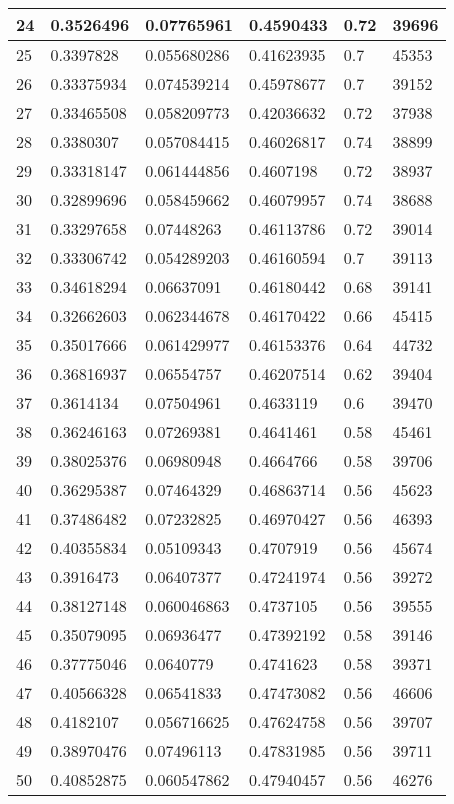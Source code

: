 \begin{longtable}{|l|l|l|l|l|l|}
24 & 0.3526496 & 0.07765961 & 0.4590433 & 0.72 & 39696 \\ \hline 
25 & 0.3397828 & 0.055680286 & 0.41623935 & 0.7 & 45353 \\ \hline 
26 & 0.33375934 & 0.074539214 & 0.45978677 & 0.7 & 39152 \\ \hline 
27 & 0.33465508 & 0.058209773 & 0.42036632 & 0.72 & 37938 \\ \hline 
28 & 0.3380307 & 0.057084415 & 0.46026817 & 0.74 & 38899 \\ \hline 
29 & 0.33318147 & 0.061444856 & 0.4607198 & 0.72 & 38937 \\ \hline 
30 & 0.32899696 & 0.058459662 & 0.46079957 & 0.74 & 38688 \\ \hline 
31 & 0.33297658 & 0.07448263 & 0.46113786 & 0.72 & 39014 \\ \hline 
32 & 0.33306742 & 0.054289203 & 0.46160594 & 0.7 & 39113 \\ \hline 
33 & 0.34618294 & 0.06637091 & 0.46180442 & 0.68 & 39141 \\ \hline 
34 & 0.32662603 & 0.062344678 & 0.46170422 & 0.66 & 45415 \\ \hline 
35 & 0.35017666 & 0.061429977 & 0.46153376 & 0.64 & 44732 \\ \hline 
36 & 0.36816937 & 0.06554757 & 0.46207514 & 0.62 & 39404 \\ \hline 
37 & 0.3614134 & 0.07504961 & 0.4633119 & 0.6 & 39470 \\ \hline 
38 & 0.36246163 & 0.07269381 & 0.4641461 & 0.58 & 45461 \\ \hline 
39 & 0.38025376 & 0.06980948 & 0.4664766 & 0.58 & 39706 \\ \hline 
40 & 0.36295387 & 0.07464329 & 0.46863714 & 0.56 & 45623 \\ \hline 
41 & 0.37486482 & 0.07232825 & 0.46970427 & 0.56 & 46393 \\ \hline 
42 & 0.40355834 & 0.05109343 & 0.4707919 & 0.56 & 45674 \\ \hline 
43 & 0.3916473 & 0.06407377 & 0.47241974 & 0.56 & 39272 \\ \hline 
44 & 0.38127148 & 0.060046863 & 0.4737105 & 0.56 & 39555 \\ \hline 
45 & 0.35079095 & 0.06936477 & 0.47392192 & 0.58 & 39146 \\ \hline 
46 & 0.37775046 & 0.0640779 & 0.4741623 & 0.58 & 39371 \\ \hline 
47 & 0.40566328 & 0.06541833 & 0.47473082 & 0.56 & 46606 \\ \hline 
48 & 0.4182107 & 0.056716625 & 0.47624758 & 0.56 & 39707 \\ \hline 
49 & 0.38970476 & 0.07496113 & 0.47831985 & 0.56 & 39711 \\ \hline 
50 & 0.40852875 & 0.060547862 & 0.47940457 & 0.56 & 46276 \\ \hline 
\end{longtable}